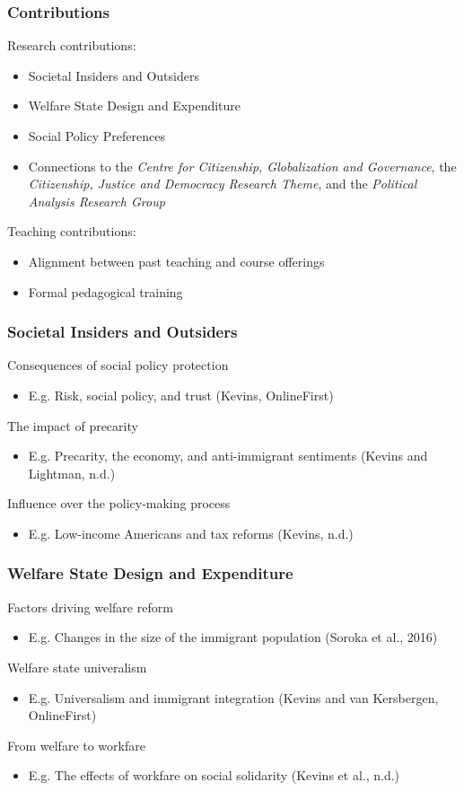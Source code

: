 \documentclass[14pt]{beamer}
\begin{document}
\begin{frame}
\frametitle{Contributions}
\pause
Research contributions:
	\begin{itemize}
		\pause
		\item Societal Insiders and Outsiders
		\pause
		\item Welfare State Design and Expenditure
		\pause
		\item Social Policy Preferences
		\pause
		\item Connections to the \textit{Centre for Citizenship, Globalization and Governance}, the \textit{Citizenship, Justice and Democracy Research Theme}, and the \textit{Political Analysis Research Group} 
	\end{itemize}
\bigskip
\pause
Teaching contributions: 
\begin{itemize}
	\pause
	\item Alignment between past teaching and course offerings
	\pause
	\item Formal pedagogical training
\end{itemize}

\end{frame}

\begin{frame}
	\pause
	\frametitle{Societal Insiders and Outsiders}
	Consequences of social policy protection
	\begin{itemize}
		\pause
		\item E.g. Risk, social policy, and trust (Kevins, OnlineFirst)
	\end{itemize}
	\pause
	The impact of precarity
	\begin{itemize}
		\pause
		\item E.g. Precarity, the economy, and anti-immigrant sentiments (Kevins and Lightman, n.d.)
	\end{itemize}
	\pause
	Influence over the policy-making process
	\begin{itemize}
		\pause
		\item E.g. Low-income Americans and tax reforms (Kevins, n.d.)
	\end{itemize}
\end{frame}

\begin{frame}
	\frametitle{Welfare State Design and Expenditure}
	\pause
	Factors driving welfare reform
	\begin{itemize}
		\pause
		\item E.g. Changes in the size of the immigrant population (Soroka et al., 2016)
	\end{itemize}
	\pause
	Welfare state univeralism
	\begin{itemize}
		\pause
		\item E.g. Universalism and immigrant integration (Kevins and van Kersbergen, OnlineFirst)
	\end{itemize}
	\pause
	From welfare to workfare 
	\begin{itemize}
		\pause
		\item E.g. The effects of workfare on social solidarity (Kevins et al., n.d.)
	\end{itemize}
\end{frame}
\end{document}
